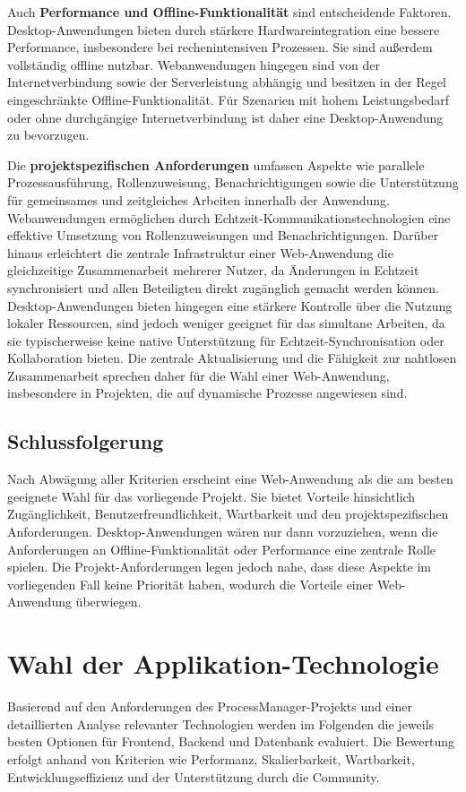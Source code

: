 Auch \textbf{Performance und Offline-Funktionalität} sind entscheidende Faktoren. Desktop-Anwendungen bieten durch stärkere Hardwareintegration eine bessere Performance, insbesondere bei rechenintensiven Prozessen. Sie sind außerdem vollständig offline nutzbar. Webanwendungen hingegen sind von der Internetverbindung sowie der Serverleistung abhängig und besitzen in der Regel eingeschränkte Offline-Funktionalität. Für Szenarien mit hohem Leistungsbedarf oder ohne durchgängige Internetverbindung ist daher eine Desktop-Anwendung zu bevorzugen.

Die \textbf{projektspezifischen Anforderungen} umfassen Aspekte wie parallele Prozessausführung, Rollenzuweisung, Benachrichtigungen sowie die Unterstützung für gemeinsames und zeitgleiches Arbeiten innerhalb der Anwendung. Webanwendungen ermöglichen durch Echtzeit-Kommunikationstechnologien eine effektive Umsetzung von Rollenzuweisungen und Benachrichtigungen. Darüber hinaus erleichtert die zentrale Infrastruktur einer Web-Anwendung die gleichzeitige Zusammenarbeit mehrerer Nutzer, da Änderungen in Echtzeit synchronisiert und allen Beteiligten direkt zugänglich gemacht werden können.
Desktop-Anwendungen bieten hingegen eine stärkere Kontrolle über die Nutzung lokaler Ressourcen, sind jedoch weniger geeignet für das simultane Arbeiten, da sie typischerweise keine native Unterstützung für Echtzeit-Synchronisation oder Kollaboration bieten. Die zentrale Aktualisierung und die Fähigkeit zur nahtlosen Zusammenarbeit sprechen daher für die Wahl einer Web-Anwendung, insbesondere in Projekten, die auf dynamische Prozesse angewiesen sind.

\subsection*{Schlussfolgerung}
Nach Abwägung aller Kriterien erscheint eine Web-Anwendung als die am besten geeignete Wahl für das vorliegende Projekt. Sie bietet Vorteile hinsichtlich Zugänglichkeit, Benutzerfreundlichkeit, Wartbarkeit und den projektspezifischen Anforderungen. Desktop-Anwendungen wären nur dann vorzuziehen, wenn die Anforderungen an Offline-Funktionalität oder Performance eine zentrale Rolle spielen. Die Projekt-Anforderungen legen jedoch nahe, dass diese Aspekte im vorliegenden Fall keine Priorität haben, wodurch die Vorteile einer Web-Anwendung überwiegen.

\cite[Vgl.][]{Mika} \cite[Vgl.][]{Medium} \cite[Vgl.][]{iFour} 

\newpage
\section{Wahl der Applikation-Technologie}
Basierend auf den Anforderungen des ProcessManager-Projekts und einer detaillierten Analyse relevanter Technologien werden im Folgenden die jeweils besten Optionen für Frontend, Backend und Datenbank evaluiert. Die Bewertung erfolgt anhand von Kriterien wie Performanz, Skalierbarkeit, Wartbarkeit, Entwicklungseffizienz und der Unterstützung durch die Community.

